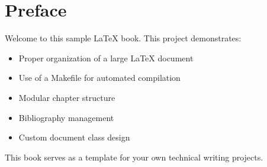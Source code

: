 \maketitle

\begin{abstract}
This is a sample LaTeX book demonstrating proper project structure and Makefile usage. 
The book covers essential topics for technical writing and document preparation.
\end{abstract}

\tableofcontents
\listoffigures
\listoftables

\chapter*{Preface}

Welcome to this sample LaTeX book. This project demonstrates:

\begin{itemize}
    \item Proper organization of a large LaTeX document
    \item Use of a Makefile for automated compilation
    \item Modular chapter structure
    \item Bibliography management
    \item Custom document class design
\end{itemize}

This book serves as a template for your own technical writing projects.